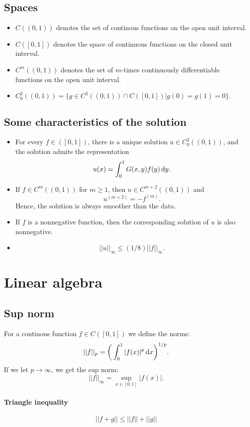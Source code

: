 \documentclass[a4paper, 11pt, notitlepage, english]{article}
\renewcommand{\d}{{\rm d}}
\begin{document}
\clearpage

\subsection{Spaces}
\begin{itemize}
    \item $C((0,1))$ denotes the set of continous functions on the open unit interval.
    \item $C([0,1])$ denotes the space of continuous functions on the closed unit interval.
    \item $C^m((0,1))$ denotes the set of $m$-times continuously differentiable functions on the open unit interval.
    \item $C^2_0((0,1)) = \{ g\in C^2((0,1)) \cap C([0,1])|g(0)=g(1)=0\}.$
\end{itemize}

\subsection{Some characteristics of the solution}
\begin{itemize}
\item For every $f\in ([0,1])$, there is a unique solution $u \in C_0^2((0,1))$, and the solution admits the representation
$$u(x) \texttt{}= \int_0^1 G(x,y)f(y) \, \d y.$$
\item If $f\in C^m((0,1))$ for $m\geq 1$, then $u\in C^{m+2}((0,1))$ and
$$u^(m+2) = -f^(m).$$
Hence, the solution is always smoother than the data.
\item If $f$ is a nonnegative function, then the corresponding solution of $u$ is also nonnegative.
\item $$||u||_\infty \leq (1/8)||f||_\infty.$$
\end{itemize}

\section{Linear algebra}
\subsection{Sup norm}
For a continous function $f\in C([0,1])$ we define the norms:
$$||f||_p = \bigg(\int_0^1 |f(x)|^p \, \d x\bigg)^{1/p}.$$
If we let $p \to \infty$, we get the sup norm:
$$||f||_\infty = \sup_{x\in[0,1]} |f(x)|.$$


\clearpage

\paragraph{Triangle inequality}
$$||f + g || \leq ||f|| + ||g|| $$
\end{document}
